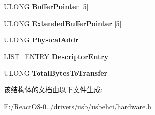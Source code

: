 \begin{DoxyCompactItemize}
\begin{tabbing}
\end{tabbing}\item 
\mbox{\label{struct___q_u_e_u_e___t_r_a_n_s_f_e_r___d_e_s_c_r_i_p_t_o_r_af365f92068634aacc2b2d285d0d04230}} 
U\+L\+O\+NG {\bfseries Buffer\+Pointer} \mbox{[}5\mbox{]}
\item 
\mbox{\label{struct___q_u_e_u_e___t_r_a_n_s_f_e_r___d_e_s_c_r_i_p_t_o_r_ad6c5c1337e60c55165b92317179b5645}} 
U\+L\+O\+NG {\bfseries Extended\+Buffer\+Pointer} \mbox{[}5\mbox{]}
\item 
\mbox{\label{struct___q_u_e_u_e___t_r_a_n_s_f_e_r___d_e_s_c_r_i_p_t_o_r_a08fca537bce82ba49d4670594a4e0944}} 
U\+L\+O\+NG {\bfseries Physical\+Addr}
\item 
\mbox{\label{struct___q_u_e_u_e___t_r_a_n_s_f_e_r___d_e_s_c_r_i_p_t_o_r_a233644df69c2c34f34138168a4fc3dbd}} 
\hyperlink{struct___l_i_s_t___e_n_t_r_y}{L\+I\+S\+T\+\_\+\+E\+N\+T\+RY} {\bfseries Descriptor\+Entry}
\item 
\mbox{\label{struct___q_u_e_u_e___t_r_a_n_s_f_e_r___d_e_s_c_r_i_p_t_o_r_a46ea4888d9b538ae54833e3dff008409}} 
U\+L\+O\+NG {\bfseries Total\+Bytes\+To\+Transfer}
\end{DoxyCompactItemize}


该结构体的文档由以下文件生成\+:\begin{DoxyCompactItemize}
\item 
E\+:/\+React\+O\+S-\/0../drivers/usb/usbehci/hardware.\+h\end{DoxyCompactItemize}
